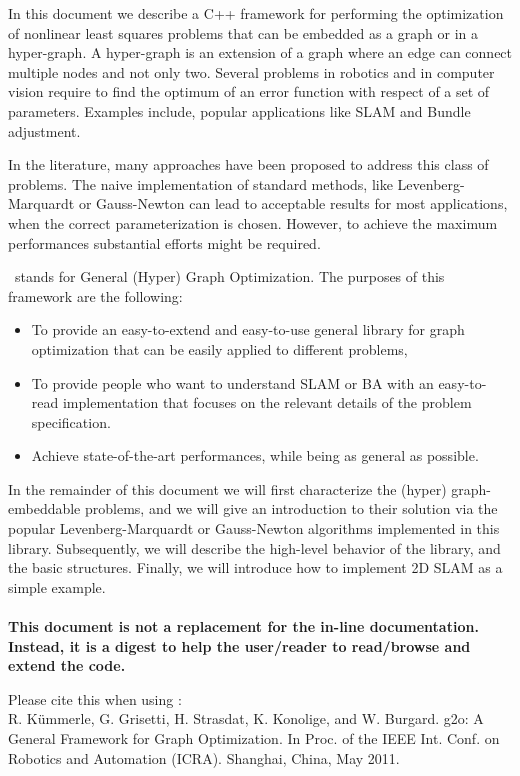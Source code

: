 \documentclass[a4paper]{article}
\begin{document}
In this document we describe a C++ framework for performing the
optimization of nonlinear least squares problems that can be embedded
as a graph or in a hyper-graph. A hyper-graph is an extension of a
graph where an edge can connect multiple nodes and not only two.
Several problems in robotics and in computer vision require to find
the optimum of an error function with respect of a set of parameters.
Examples include, popular applications like SLAM and Bundle
adjustment.

In the literature, many approaches have been proposed to address this
class of problems. The naive implementation of standard methods, like
Levenberg-Marquardt or Gauss-Newton can lead to acceptable results for
most applications, when the correct parameterization is
chosen. However, to achieve the maximum performances substantial
efforts might be required.

\gopt\ stands for General (Hyper) Graph Optimization. The purposes of
this framework are the following:
\begin{itemize}
\item To provide an easy-to-extend and easy-to-use general library for
  graph optimization that can be easily applied to different problems,
\item To provide people who want to understand SLAM or BA with an
  easy-to-read implementation that focuses on the relevant details of
  the problem specification.
\item Achieve state-of-the-art performances,
  while being as general as possible.
\end{itemize}

In the remainder of this document we will first characterize the
(hyper) graph-embeddable problems, and we will give an introduction to
their solution via the popular Levenberg-Marquardt or Gauss-Newton
algorithms implemented in this library.  Subsequently, we will
describe the high-level behavior of the library, and the basic
structures.  Finally, we will introduce how to implement 2D SLAM as a
simple example.\\
\vspace{.5cm}\\
\textbf{This document is not a replacement for the
  in-line documentation.  Instead, it is a digest to help the
  user/reader to read/browse and extend the code.}

  \vspace{.5cm}
\noindent Please cite this when using \gopt:\\
R. K\"ummerle, G. Grisetti, H. Strasdat, K. Konolige, and W. Burgard.
g2o: A General Framework for Graph Optimization.
In Proc. of the IEEE Int. Conf. on Robotics and Automation (ICRA). Shanghai, China, May 2011.
\end{document}
